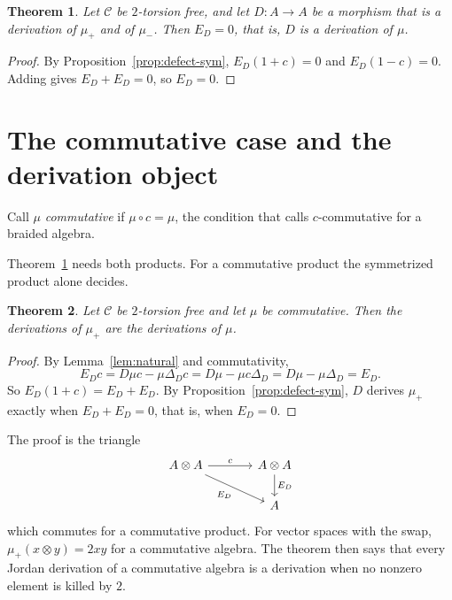 \documentclass[]{interact}
\theoremstyle{plain}
\newtheorem{theorem}{Theorem}[section]
\theoremstyle{definition}
\theoremstyle{remark}
\begin{document}
\begin{theorem}\label{thm:both}
Let $\mathcal{C}$ be $2$-torsion free, and let $D \colon A \to A$ be a morphism that is a derivation of $\mu_+$ and of $\mu_-$. Then $E_D = 0$, that is, $D$ is a derivation of $\mu$.
\end{theorem}

\begin{proof}
By Proposition~\ref{prop:defect-sym}, $E_D (1 + c) = 0$ and $E_D (1 - c) = 0$.
Adding gives $E_D + E_D = 0$, so $E_D = 0$.
\end{proof}

\section{The commutative case and the derivation object}\label{sec:commutative}

Call $\mu$ \emph{commutative} if $\mu \circ c = \mu$, the condition that \citet[Definition 1.4]{Ion2010} calls $c$-commutative for a braided algebra.

Theorem~\ref{thm:both} needs both products.
For a commutative product the symmetrized product alone decides.

\begin{theorem}\label{thm:commutative}
Let $\mathcal{C}$ be $2$-torsion free and let $\mu$ be commutative.
Then the derivations of $\mu_+$ are the derivations of $\mu$.
\end{theorem}

\begin{proof}
By Lemma~\ref{lem:natural} and commutativity,
\[
E_D c = D \mu c - \mu \Delta_D c = D \mu - \mu c \Delta_D = D \mu - \mu \Delta_D = E_D.
\]
So $E_D (1 + c) = E_D + E_D$.
By Proposition~\ref{prop:defect-sym}, $D$ derives $\mu_+$ exactly when $E_D + E_D = 0$, that is, when $E_D = 0$.
\end{proof}

The proof is the triangle
\[
\begin{tikzcd}[column sep=large]
A \otimes A \arrow[r, "c"] \arrow[dr, "E_D"'] & A \otimes A \arrow[d, "E_D"] \\
 & A
\end{tikzcd}
\]
which commutes for a commutative product. %
For vector spaces with the swap, $\mu_+(x \otimes y) = 2xy$ for a commutative algebra.
The theorem then says that every Jordan derivation of a commutative algebra is a derivation when no nonzero element is killed by $2$. %
\end{document}
